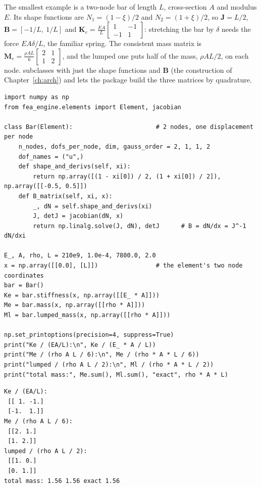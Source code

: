 The smallest example is a two-node bar of length $L$, cross-section $A$ and modulus $E$. Its shape functions are $N_1=(1-\xi)/2$ and $N_2=(1+\xi)/2$, so $\bm J=L/2$, $\bm B=[-1/L,\ 1/L]$ and $\bm K_e=\frac{EA}{L}\left[\begin{smallmatrix}1&-1\\-1&1\end{smallmatrix}\right]$: stretching the bar by $\delta$ needs the force $EA\delta/L$, the familiar spring. The consistent mass matrix is $\bm M_e=\frac{\rho AL}{6}\left[\begin{smallmatrix}2&1\\1&2\end{smallmatrix}\right]$, and the lumped one puts half of the mass, $\rho AL/2$, on each node.  subclasses  with just the shape functions and $\bm B$ (the construction of Chapter~\ref{ch:arch}) and lets the package build the three matrices by quadrature.

\begin{lstlisting}[caption={The five steps for a two-node bar: the package builds $\bm K_e$, $\bm M_e$ and the lumped mass from the shape functions and $\bm B$ alone (run with the package on the path).},label={lst:el-bar}]
import numpy as np
from fea_engine.elements import Element, jacobian

class Bar(Element):                       # 2 nodes, one displacement per node
    n_nodes, dofs_per_node, dim, gauss_order = 2, 1, 1, 2
    dof_names = ("u",)
    def shape_and_derivs(self, xi):
        return np.array([(1 - xi[0]) / 2, (1 + xi[0]) / 2]), np.array([[-0.5, 0.5]])
    def B_matrix(self, xi, x):
        _, dN = self.shape_and_derivs(xi)
        J, detJ = jacobian(dN, x)
        return np.linalg.solve(J, dN), detJ      # B = dN/dx = J^-1 dN/dxi

E_, A, rho, L = 210e9, 1.0e-4, 7800.0, 2.0
x = np.array([[0.0], [L]])                # the element's two node coordinates
bar = Bar()
Ke = bar.stiffness(x, np.array([[E_ * A]]))
Me = bar.mass(x, np.array([[rho * A]]))
Ml = bar.lumped_mass(x, np.array([[rho * A]]))

np.set_printoptions(precision=4, suppress=True)
print("Ke / (EA/L):\n", Ke / (E_ * A / L))
print("Me / (rho A L / 6):\n", Me / (rho * A * L / 6))
print("lumped / (rho A L / 2):\n", Ml / (rho * A * L / 2))
print("total mass:", Me.sum(), Ml.sum(), "exact", rho * A * L)
\end{lstlisting}

\begin{lstlisting}[numbers=none,language={},keywordstyle={},commentstyle={},frame=single,aboveskip=2pt]
Ke / (EA/L):
 [[ 1. -1.]
 [-1.  1.]]
Me / (rho A L / 6):
 [[2. 1.]
 [1. 2.]]
lumped / (rho A L / 2):
 [[1. 0.]
 [0. 1.]]
total mass: 1.56 1.56 exact 1.56
\end{lstlisting}

